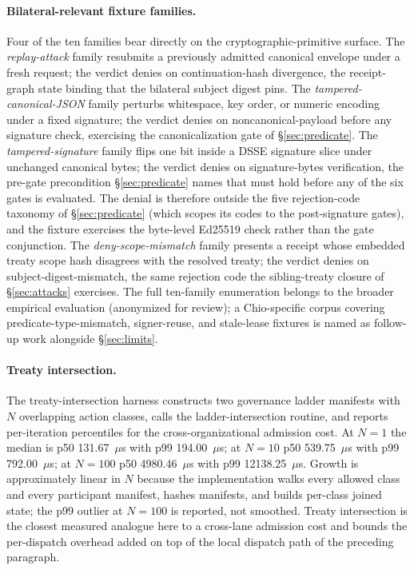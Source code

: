\paragraph{Bilateral-relevant fixture families.} Four of the ten families bear directly on the cryptographic-primitive surface. The \emph{replay-attack} family resubmits a previously admitted canonical envelope under a fresh request; the verdict denies on continuation-hash divergence, the receipt-graph state binding that the bilateral subject digest pins. The \emph{tampered-canonical-JSON} family perturbs whitespace, key order, or numeric encoding under a fixed signature; the verdict denies on noncanonical-payload before any signature check, exercising the canonicalization gate of \S\ref{sec:predicate}. The \emph{tampered-signature} family flips one bit inside a DSSE signature slice under unchanged canonical bytes; the verdict denies on signature-bytes verification, the pre-gate precondition \S\ref{sec:predicate} names that must hold before any of the six gates is evaluated. The denial is therefore outside the five rejection-code taxonomy of \S\ref{sec:predicate} (which scopes its codes to the post-signature gates), and the fixture exercises the byte-level Ed25519 check rather than the gate conjunction. The \emph{deny-scope-mismatch} family presents a receipt whose embedded treaty scope hash disagrees with the resolved treaty; the verdict denies on subject-digest-mismatch, the same rejection code the sibling-treaty closure of \S\ref{sec:attacks} exercises. The full ten-family enumeration belongs to the broader empirical evaluation (anonymized for review); a Chio-specific corpus covering predicate-type-mismatch, signer-reuse, and stale-lease fixtures is named as follow-up work alongside \S\ref{sec:limits}.

\paragraph{Treaty intersection.} The treaty-intersection harness constructs two governance ladder manifests with $N$ overlapping action classes, calls the ladder-intersection routine, and reports per-iteration percentiles for the cross-organizational admission cost. At $N{=}1$ the median is p50 131.67~$\mu$s with p99 194.00~$\mu$s; at $N{=}10$ p50 539.75~$\mu$s with p99 792.00~$\mu$s; at $N{=}100$ p50 4980.46~$\mu$s with p99 12138.25~$\mu$s. Growth is approximately linear in $N$ because the implementation walks every allowed class and every participant manifest, hashes manifests, and builds per-class joined state; the p99 outlier at $N{=}100$ is reported, not smoothed. Treaty intersection is the closest measured analogue here to a cross-lane admission cost and bounds the per-dispatch overhead added on top of the local dispatch path of the preceding paragraph.

